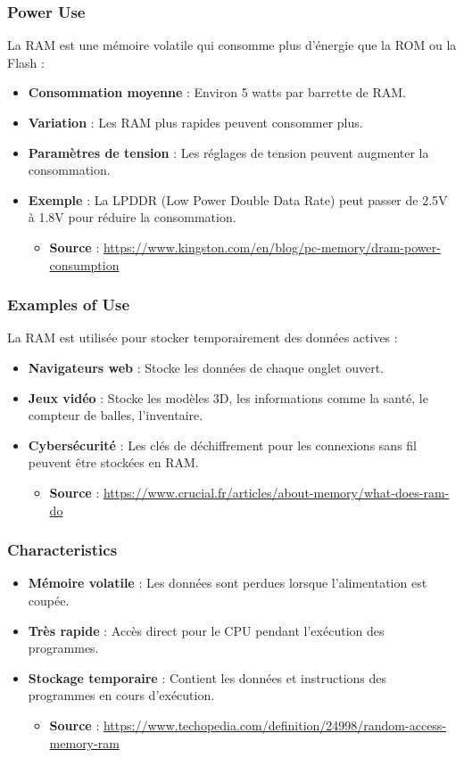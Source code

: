 \documentclass[10pt,a4paper]{article}
\begin{document}
\subsubsection*{Power Use}
La RAM est une mémoire volatile qui consomme plus d'énergie que la ROM ou la Flash :
\begin{itemize}
    \item \textbf{Consommation moyenne} : Environ 5 watts par barrette de RAM.
    \item \textbf{Variation} : Les RAM plus rapides peuvent consommer plus.
    \item \textbf{Paramètres de tension} : Les réglages de tension peuvent augmenter la consommation.
    \item \textbf{Exemple} : La LPDDR (Low Power Double Data Rate) peut passer de 2.5V à 1.8V pour réduire la consommation.
    \begin{itemize}
        \item \textbf{Source} : \url{https://www.kingston.com/en/blog/pc-memory/dram-power-consumption}
    \end{itemize}
\end{itemize}

\subsubsection*{Examples of Use}
La RAM est utilisée pour stocker temporairement des données actives :
\begin{itemize}
    \item \textbf{Navigateurs web} : Stocke les données de chaque onglet ouvert.
    \item \textbf{Jeux vidéo} : Stocke les modèles 3D, les informations comme la santé, le compteur de balles, l'inventaire.
    \item \textbf{Cybersécurité} : Les clés de déchiffrement pour les connexions sans fil peuvent être stockées en RAM.
    \begin{itemize}
        \item \textbf{Source} : \url{https://www.crucial.fr/articles/about-memory/what-does-ram-do}
    \end{itemize}
\end{itemize}

\subsubsection*{Characteristics}
\begin{itemize}
    \item \textbf{Mémoire volatile} : Les données sont perdues lorsque l'alimentation est coupée.
    \item \textbf{Très rapide} : Accès direct pour le CPU pendant l'exécution des programmes.
    \item \textbf{Stockage temporaire} : Contient les données et instructions des programmes en cours d'exécution.
    \begin{itemize}
        \item \textbf{Source} : \url{https://www.techopedia.com/definition/24998/random-access-memory-ram}
    \end{itemize}
\end{itemize}
\end{document}
